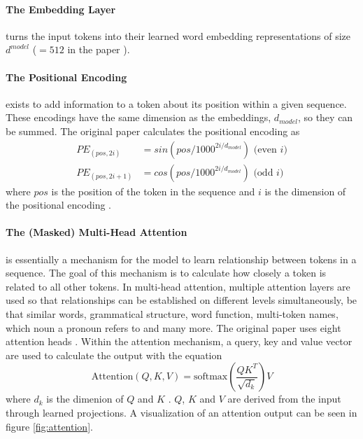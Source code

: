 \paragraph{The Embedding Layer} turns the input tokens into their learned word embedding representations of size $d^{model}$ ($=512$ in the paper \cite{Vaswani.2017}).

\paragraph{The Positional Encoding} exists to add information to a token about its position within a given sequence.
These encodings have the same dimension as the embeddings, $d_{model}$, so they can be summed.
The original paper calculates the positional encoding as
\begin{equation}
    \begin{aligned}
        PE_{(pos,2i)} &= sin(pos/1000^{2i/d_{model}}) \text{ (even }i\text{)} \\
        PE_{(pos,2i+1)} &= cos(pos/1000^{2i/d_{model}}) \text{ (odd }i\text{)}
    \end{aligned}
\end{equation}
where $pos$ is the position of the token in the sequence and $i$ is the dimension of the positional encoding \cite{Vaswani.2017}.

\paragraph{The (Masked) Multi-Head Attention} is essentially a mechanism for the model to learn relationship between tokens in a sequence.
The goal of this mechanism is to calculate how closely a token is related to all other tokens.
In multi-head attention, multiple attention layers are used so that relationships can be established on different levels simultaneously, be that similar words, grammatical structure, word function, multi-token names, which noun a pronoun refers to and many more.
The original paper uses eight attention heads \cite{Vaswani.2017}.
Within the attention mechanism, a query, key and value vector are used to calculate the output with the equation
\begin{equation}
    \text{Attention}(Q,K,V)=\text{softmax}(\frac{QK^T}{\sqrt{d_k}})V
\end{equation}
where $d_k$ is the dimenion of $Q$ and $K$ \cite{Vaswani.2017}.
$Q$, $K$ and $V$ are derived from the input through learned projections.
A visualization of an attention output can be seen in figure \ref{fig:attention}.

